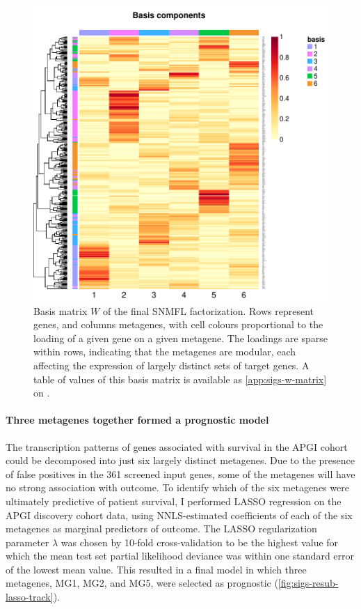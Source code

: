 \documentclass[dissertation.tex]{subfiles}
\begin{document}
\begin{figure}
\centering
\includegraphics[width=.7\linewidth]{analysis/biosurv/reports/18_SIS_diag_dsd_final/figure/nmf-plots-2}
\caption{Basis matrix $W$ of the final \acrshort{SNMFL} factorization.  Rows represent genes, and columns metagenes, with cell colours proportional to the loading of a given gene on a given metagene.  The loadings are sparse within rows, indicating that the metagenes are modular, each affecting the expression of largely distinct sets of target genes.  A table of values of this basis matrix is available as \cref{app:sigs-w-matrix} on .\label{fig:sigs-nmf-basis}}
\end{figure}

\paragraph{Three metagenes together formed a prognostic model}
The transcription patterns of genes associated with survival in the \gls{APGI} cohort could be decomposed into just six largely distinct metagenes.  Due to the presence of false positives in the 361 screened input genes, some of the metagenes will have no strong association with outcome.  To identify which of the six metagenes were ultimately predictive of patient survival, I performed \gls{LASSO} regression on the \gls{APGI} discovery cohort data, using \gls{NNLS}-estimated coefficients of each of the six metagenes as marginal predictors of outcome.  The \gls{LASSO} regularization parameter $\lambda$ was chosen by 10-fold cross-validation to be the highest value for which the mean test set partial likelihood deviance was within one standard error of the lowest mean value.  This resulted in a final model in which three metagenes, MG1, MG2, and MG5, were selected as prognostic (\cref{fig:sigs-resub-lasso-track}).
\end{document}
